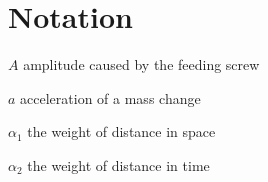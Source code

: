 \chapter*{Notation}

\begin{compactitem}[]
	\item $A$ amplitude caused by the feeding screw
	\item $a$ acceleration of a mass change
	\item $\alpha_1$ the weight of distance in space
	\item $\alpha_2$ the weight of distance in time
\end{compactitem}